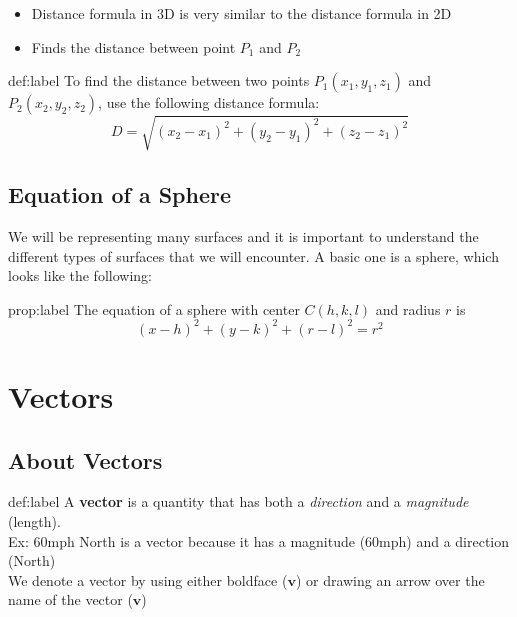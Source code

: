 \documentclass{package/notes}
\begin{document}
	\begin{itemize}
		\item Distance formula in 3D is very similar to the distance formula in 2D
		\item Finds the distance between point $P_1$ and $P_2$ 
	\end{itemize}

	\newpage
	\begin{definition}{def:label}
		To find the distance between two points $P_1(x_1, y_1, z_1)$ and $P_2(x_2,y_2,z_2)$, use the following distance formula:
		$$D = \sqrt{(x_2-x_1)^2 + (y_2-y_1)^2 + (z_2-z_1)^2}$$
	\end{definition}

\subsection{Equation of a Sphere}
	
	We will be representing many surfaces and it is important to understand the different types of surfaces that we will encounter. A basic one is a sphere, which looks like the following:
	
	\begin{proposition}{prop:label}
	The equation of a sphere with center $C(h,k,l)$ and radius $r$ is
	$$(x-h)^2 + (y-k)^2 + (r-l)^2 = r^2$$
	\end{proposition}


\section{Vectors}

\subsection{About Vectors}

	\begin{definition}[Vectors]{def:label}
		A \textbf{vector} is a quantity that has both a \textit{direction} and a \textit{magnitude} (length).\\

	Ex: 60mph North is a vector because it has a magnitude (60mph) and a direction (North)\\

	We denote a vector by using either boldface ($\mathbf v$) or drawing an arrow over the name of the vector ($\mathbf v$)
	\end{definition}
\end{document}
